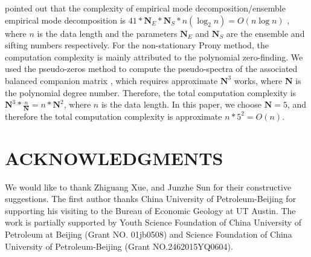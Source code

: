 \citet[]{eemd_comp} pointed out that the complexity of empirical mode decomposition/ensemble
empirical mode decomposition is $41*\mathbf{N}_E*\mathbf{N}_S*n(\log_2n)=O(n\log n)$
, where $n$ is the data length and the parameters $\mathbf{N}_E$ and $\mathbf{N}_S$ are the
ensemble and sifting numbers respectively. For the non-stationary Prony method, the computation
complexity is mainly attributed to the polynomial zero-finding. We used the pseudo-zeros 
method to compute the pseudo-spectra of the associated balanced 
companion matrix \cite[]{roots}, which requires approximate $\mathbf{N}^3$ works, where $\mathbf{N}$
is the polynomial degree number. Therefore, the total computation complexity is 
$\mathbf{N}^3*\frac{n}{\mathbf{N}}=n*\mathbf{N}^2$, where $n$ is the data length.
In this paper, we choose $\mathbf{N}=5$, and therefore the total computation complexity is approximate 
$n*5^2 = O(n)$.
\section{ACKNOWLEDGMENTS}
We would like to thank Zhiguang Xue, and Junzhe Sun for their constructive 
suggestions. The first author thanks China University of Petroleum-Beijing 
for supporting his visiting to the Bureau of Economic Geology at UT Austin. 
The work is partially supported by Youth Science Foundation of China 
University of Petroleum at Beijing (Grant NO. 01jb0508) and Science Foundation 
of China University of Petroleum-Beijing (Grant NO.2462015YQ0604).

